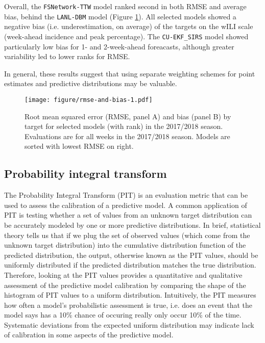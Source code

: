 \documentclass{article}\usepackage[]{graphicx}\usepackage[]{color}
\begin{document}
Overall, the {\tt FSNetwork-TTW} model ranked second in both RMSE and average bias, behind the {\tt LANL-DBM} model (Figure \ref{fig:bias-rmse}).
All selected models showed a negative bias (i.e. underestimation, on average) of the targets on the wILI scale (week-ahead incidence and peak percentage).
The {\tt CU-EKF\_SIRS} model showed particularly low bias for 1- and 2-week-ahead foreacasts, although greater variability led to lower ranks for RMSE.

In general, these results suggest that using separate weighting schemes for point estimates and predictive distributions may be valuable.

\begin{figure}[htbp]
\begin{center}
\texttt{[image: figure/rmse-and-bias-1.pdf]}
\caption{Root mean squared error (RMSE, panel A) and bias (panel B) by target for selected models (with rank) in the 2017/2018 season. Evaluations are for all weeks in the 2017/2018 season. Models are sorted with lowest RMSE on right.}
\label{fig:bias-rmse}
\end{center}
\end{figure}



\subsection{Probability integral transform}

The Probability Integral Transform (PIT) is an evaluation metric that can be used to assess the calibration of a predictive model.
A common application of PIT is testing whether a set of values from an unknown target distribution can be accurately modeled by one or more predictive distributions. 
In brief, statistical theory tells us that if we plug the set of observed values (which come from the unknown target distribution) into the cumulative distribution function of the predicted distribution, the output, otherwise known as the PIT values, should be uniformly distributed if the predicted distribution matches the true distribution.\cite{angus1994probability,diebold1997evaluating}
Therefore, looking at the PIT values provides a quantitative and qualitative assessment of the predictive model calibration by comparing the shape of the histogram of PIT values to a uniform distribution. 
Intuitively, the PIT measures how often a model's probabilistic assessment is true, i.e. does an event that the model says has a 10\% chance of occuring really only occur 10\% of the time.
Systematic deviations from the expected uniform distribution may indicate lack of calibration in some aspects of the predictive model.
\end{document}
